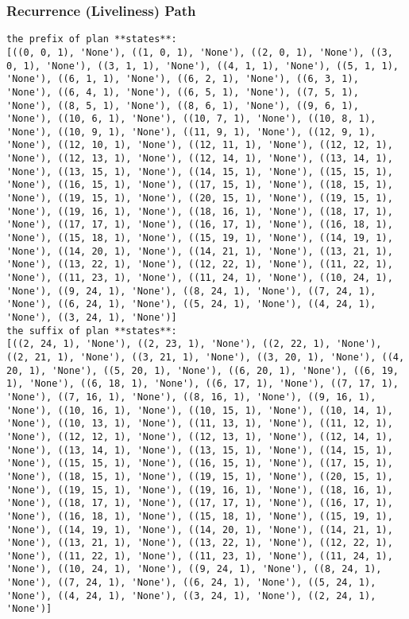 \subsubsection*{Recurrence (Liveliness) Path}
\begin{lstlisting}
the prefix of plan **states**:
[((0, 0, 1), 'None'), ((1, 0, 1), 'None'), ((2, 0, 1), 'None'), ((3, 0, 1), 'None'), ((3, 1, 1), 'None'), ((4, 1, 1), 'None'), ((5, 1, 1), 'None'), ((6, 1, 1), 'None'), ((6, 2, 1), 'None'), ((6, 3, 1), 'None'), ((6, 4, 1), 'None'), ((6, 5, 1), 'None'), ((7, 5, 1), 'None'), ((8, 5, 1), 'None'), ((8, 6, 1), 'None'), ((9, 6, 1), 'None'), ((10, 6, 1), 'None'), ((10, 7, 1), 'None'), ((10, 8, 1), 'None'), ((10, 9, 1), 'None'), ((11, 9, 1), 'None'), ((12, 9, 1), 'None'), ((12, 10, 1), 'None'), ((12, 11, 1), 'None'), ((12, 12, 1), 'None'), ((12, 13, 1), 'None'), ((12, 14, 1), 'None'), ((13, 14, 1), 'None'), ((13, 15, 1), 'None'), ((14, 15, 1), 'None'), ((15, 15, 1), 'None'), ((16, 15, 1), 'None'), ((17, 15, 1), 'None'), ((18, 15, 1), 'None'), ((19, 15, 1), 'None'), ((20, 15, 1), 'None'), ((19, 15, 1), 'None'), ((19, 16, 1), 'None'), ((18, 16, 1), 'None'), ((18, 17, 1), 'None'), ((17, 17, 1), 'None'), ((16, 17, 1), 'None'), ((16, 18, 1), 'None'), ((15, 18, 1), 'None'), ((15, 19, 1), 'None'), ((14, 19, 1), 'None'), ((14, 20, 1), 'None'), ((14, 21, 1), 'None'), ((13, 21, 1), 'None'), ((13, 22, 1), 'None'), ((12, 22, 1), 'None'), ((11, 22, 1), 'None'), ((11, 23, 1), 'None'), ((11, 24, 1), 'None'), ((10, 24, 1), 'None'), ((9, 24, 1), 'None'), ((8, 24, 1), 'None'), ((7, 24, 1), 'None'), ((6, 24, 1), 'None'), ((5, 24, 1), 'None'), ((4, 24, 1), 'None'), ((3, 24, 1), 'None')]
the suffix of plan **states**:
[((2, 24, 1), 'None'), ((2, 23, 1), 'None'), ((2, 22, 1), 'None'), ((2, 21, 1), 'None'), ((3, 21, 1), 'None'), ((3, 20, 1), 'None'), ((4, 20, 1), 'None'), ((5, 20, 1), 'None'), ((6, 20, 1), 'None'), ((6, 19, 1), 'None'), ((6, 18, 1), 'None'), ((6, 17, 1), 'None'), ((7, 17, 1), 'None'), ((7, 16, 1), 'None'), ((8, 16, 1), 'None'), ((9, 16, 1), 'None'), ((10, 16, 1), 'None'), ((10, 15, 1), 'None'), ((10, 14, 1), 'None'), ((10, 13, 1), 'None'), ((11, 13, 1), 'None'), ((11, 12, 1), 'None'), ((12, 12, 1), 'None'), ((12, 13, 1), 'None'), ((12, 14, 1), 'None'), ((13, 14, 1), 'None'), ((13, 15, 1), 'None'), ((14, 15, 1), 'None'), ((15, 15, 1), 'None'), ((16, 15, 1), 'None'), ((17, 15, 1), 'None'), ((18, 15, 1), 'None'), ((19, 15, 1), 'None'), ((20, 15, 1), 'None'), ((19, 15, 1), 'None'), ((19, 16, 1), 'None'), ((18, 16, 1), 'None'), ((18, 17, 1), 'None'), ((17, 17, 1), 'None'), ((16, 17, 1), 'None'), ((16, 18, 1), 'None'), ((15, 18, 1), 'None'), ((15, 19, 1), 'None'), ((14, 19, 1), 'None'), ((14, 20, 1), 'None'), ((14, 21, 1), 'None'), ((13, 21, 1), 'None'), ((13, 22, 1), 'None'), ((12, 22, 1), 'None'), ((11, 22, 1), 'None'), ((11, 23, 1), 'None'), ((11, 24, 1), 'None'), ((10, 24, 1), 'None'), ((9, 24, 1), 'None'), ((8, 24, 1), 'None'), ((7, 24, 1), 'None'), ((6, 24, 1), 'None'), ((5, 24, 1), 'None'), ((4, 24, 1), 'None'), ((3, 24, 1), 'None'), ((2, 24, 1), 'None')]

\end{lstlisting}
